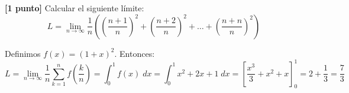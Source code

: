 \documentclass[12pt]{article}
\begin{document}
\begin{ejercicio}\textbf{[1 punto]}
    Calcular el siguiente límite:
    \begin{equation*}
        L=\lim_{n\to \infty} \frac{1}{n} \left(
        \left(\frac{n+1}{n}\right)^2+
        \left(\frac{n+2}{n}\right)^2
        +\dots +
        \left(\frac{n+n}{n}\right)^2
        \right)
    \end{equation*}

    Definimos $f(x)=(1+x)^2$. Entonces:
    \begin{equation*}
        L=\lim_{n\to \infty} \frac{1}{n}\sum_{k=1}^n f\left(\frac{k}{n}\right) = \int_0^1 f(x)\;dx
        = \int_0^1 x^2 +2x +1 \;dx
        = \left[\frac{x^3}{3}+x^2 +x\right]_0^1
        = 2+\frac{1}{3} = \frac{7}{3}
    \end{equation*}
\end{ejercicio}
\end{document}
